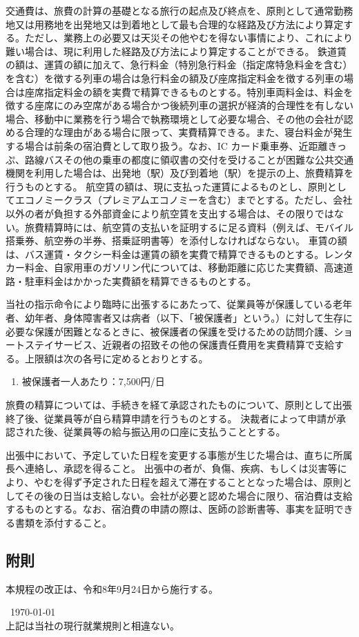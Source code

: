 \documentclass[10pt,a4paper,uplatex]{jsarticle}
\begin{document}
交通費は、旅費の計算の基礎となる旅行の起点及び終点を、原則として通常勤務地又は用務地を出発地又は到着地として最も合理的な経路及び方法により算定する。ただし、業務上の必要又は天災その他やむを得ない事情により、これにより難い場合は、現に利用した経路及び方法により算定することができる。
\term 鉄道賃の額は、運賃の額に加えて、急行料金（特別急行料金（指定席特急料金を含む）を含む）を徴する列車の場合は急行料金の額及び座席指定料金を徴する列車の場合は座席指定料金の額を実費で精算できるものとする。特別車両料金は、料金を徴する座席にのみ空席がある場合かつ後続列車の選択が経済的合理性を有しない場合、移動中に業務を行う場合で執務環境として必要な場合、その他の会社が認める合理的な理由がある場合に限って、実費精算できる。また、寝台料金が発生する場合は前条の宿泊費として取り扱う。なお、IC カード乗車券、近距離きっぷ、路線バスその他の乗車の都度に領収書の交付を受けることが困難な公共交通機関を利用した場合は、出発地（駅）及び到着地（駅）を提示の上、旅費精算を行うものとする。
\term 航空賃の額は、現に支払った運賃によるものとし、原則としてエコノミークラス（プレミアムエコノミーを含む）までとする。ただし、会社以外の者が負担する外部資金により航空賃を支出する場合は、その限りではない。旅費精算時には、航空賃の支払いを証明するに足る資料（例えば、モバイル搭乗券、航空券の半券、搭乗証明書等）を添付しなければならない。
\term 車賃の額は、バス運賃・タクシー料金は運賃の額を実費で精算できるものとする。レンタカー料金、自家用車のガソリン代については、移動距離に応じた実費額、高速道路・駐車料金はかかった実費額を精算できるものとする。

当社の指示命令により臨時に出張するにあたって、従業員等が保護している老年者、幼年者、身体障害者又は病者（以下、「被保護者」という。）に対して生存に必要な保護が困難となるときに、被保護者の保護を受けるための訪問介護、ショートステイサービス、近親者の招致その他の保護責任費用を実費精算で支給する。上限額は次の各号に定めるとおりとする。
\begin{enumerate}
    \item 被保護者一人あたり：7,500円/日
\end{enumerate}

旅費の精算については、手続きを経て承認されたものについて、原則として出張終了後、従業員等が自ら精算申請を行うものとする。
\term 決裁者によって申請が承認された後、従業員等の給与振込用の口座に支払うこととする。

出張中において、予定していた日程を変更する事態が生じた場合は、直ちに所属長へ連絡し、承認を得ること。
\term 出張中の者が、負傷、疾病、もしくは災害等により、やむを得ず予定された日程を超えて滞在することとなった場合は、原則としてその後の日当は支給しない。会社が必要と認めた場合に限り、宿泊費は支給するものとする。なお、宿泊費の申請の際は、医師の診断書等、事実を証明できる書類を添付すること。

\subsection*{附則}
本規程の改正は、令和8年9月24日から施行する。

\begin{flushleft}\
\today\\
\vspace{10pt}
上記は当社の現行就業規則と相違ない。\\
\vspace{10pt}
\MakeSignatureField
\end{flushleft}
\end{document}
